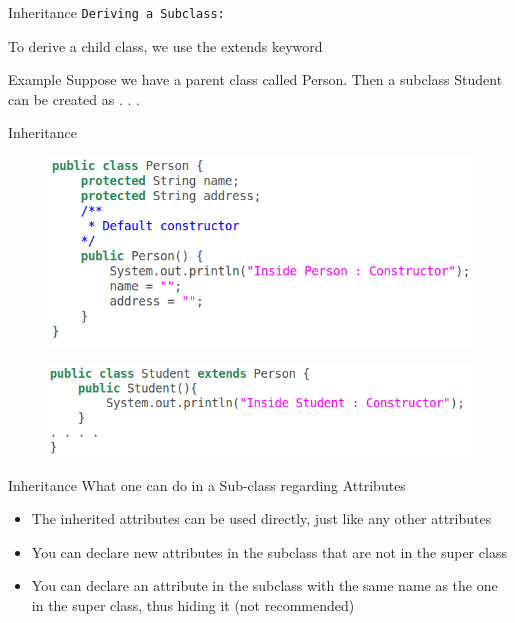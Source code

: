 \documentclass[14pt]{beamer}
\begin{document}
\begin{frame}{Inheritance}
 \texttt{Deriving a Subclass:}
 
 To derive a child class, we use the extends keyword
 \begin{block}{Example}
  Suppose we have a parent class called Person. Then a subclass Student can be created as . . . 
 \end{block}
\end{frame}

\begin{frame}[fragile]{Inheritance}
\begin{figure}[H]
\includegraphics[scale=.4]{person-class.png}
\end{figure}
\begin{figure}[H]
\includegraphics[scale=.4]{student-class.png}
\end{figure}
\end{frame}

\begin{frame}{Inheritance}
 What one can do in a Sub-class regarding Attributes
 \begin{itemize}
  \item The inherited attributes can be used directly, just like any other attributes
  \item You can declare new attributes in the subclass that are not in the super class
  \item You can declare an attribute in the subclass with the same name as the one in the super class, thus hiding it (not recommended)
   \end{itemize}
\end{frame}
\end{document}

